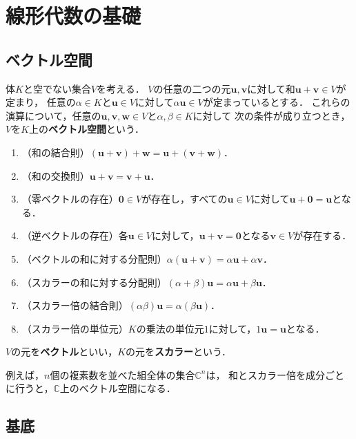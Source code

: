 \section{線形代数の基礎}

\subsection{ベクトル空間}

\begin{defi}[ベクトル空間]
  \label{def:vector-space}
  体$K$と空でない集合$V$を考える．
  $V$の任意の二つの元$\bm{u},\bm{v}$に対して和$\bm{u}+\bm{v}\in V$が定まり，
  任意の$\alpha\in K$と$\bm{u}\in V$に対して$\alpha\bm{u}\in V$が定まっているとする．
  これらの演算について，任意の$\bm{u},\bm{v},\bm{w}\in V$と$\alpha,\beta\in K$に対して
  次の条件が成り立つとき，$V$を$K$上の\textbf{ベクトル空間}という．
  \begin{enumerate}[(1)]
    \item （和の結合則）$(\bm{u}+\bm{v})+\bm{w}=\bm{u}+(\bm{v}+\bm{w})$．
    \item （和の交換則）$\bm{u}+\bm{v}=\bm{v}+\bm{u}$．
    \item （零ベクトルの存在）$\bm{0}\in V$が存在し，すべての$\bm{u}\in V$に対して$\bm{u}+\bm{0}=\bm{u}$となる．
    \item （逆ベクトルの存在）各$\bm{u}\in V$に対して，$\bm{u}+\bm{v}=\bm{0}$となる$\bm{v}\in V$が存在する．
    \item （ベクトルの和に対する分配則）$\alpha(\bm{u}+\bm{v})=\alpha\bm{u}+\alpha\bm{v}$．
    \item （スカラーの和に対する分配則）$(\alpha+\beta)\bm{u}=\alpha\bm{u}+\beta\bm{u}$．
    \item （スカラー倍の結合則）$(\alpha\beta)\bm{u}=\alpha(\beta\bm{u})$．
    \item （スカラー倍の単位元）$K$の乗法の単位元$1$に対して，$1\bm{u}=\bm{u}$となる．
  \end{enumerate}
  $V$の元を\textbf{ベクトル}といい，$K$の元を\textbf{スカラー}という．
\end{defi}

例えば，$n$個の複素数を並べた組全体の集合$\mathbb C^n$は，
和とスカラー倍を成分ごとに行うと，$\mathbb C$上のベクトル空間になる．

\subsection{基底}

